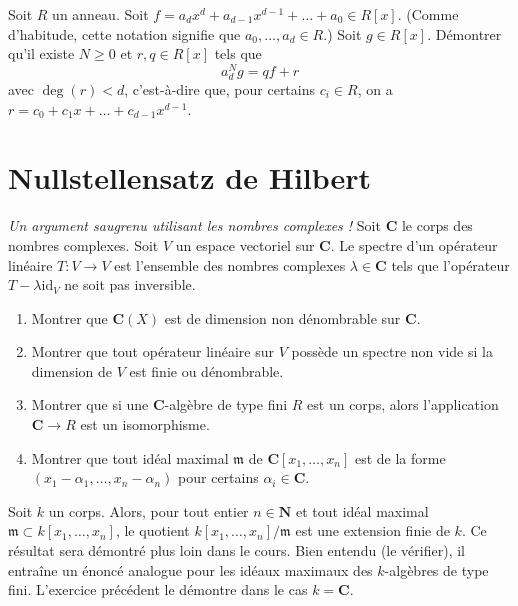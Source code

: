 \begin{exercise}
\label{exercise-division-with-remainder}
Soit $R$ un anneau. Soit
$f = a_d x^d + a_{d - 1} x^{d - 1} + \ldots + a_0 \in R[x]$.
(Comme d'habitude, cette notation signifie que $a_0, \ldots, a_d \in R$.) Soit $g \in R[x]$.
Démontrer qu'il existe $N \geq 0$ et $r, q \in R[x]$ tels que
$$
a_d^N g = q f + r
$$
avec $\deg(r) < d$, c'est-à-dire que, pour certains $c_i \in R$, on a
$r = c_0 + c_1 x + \ldots + c_{d - 1}x^{d - 1}$.
\end{exercise}







\section{Nullstellensatz de Hilbert}
\label{section-Hilbert-Nullstellensatz}


\begin{exercise}
\label{exercise-uncountable}
{\it Un argument saugrenu utilisant les nombres complexes !}
Soit ${\mathbf C}$ le corps des nombres complexes. Soit $V$ un espace vectoriel
sur ${\mathbf C}$. Le spectre d'un opérateur linéaire
$T : V \to V$ est l'ensemble des nombres complexes $\lambda \in {\mathbf C}$
tels que l'opérateur $T - \lambda \text{id}_V$ ne soit pas inversible.
\begin{enumerate}
\item Montrer que $\mathbf{C}(X)$
est de dimension non dénombrable sur ${\mathbf C}$.
\item Montrer que tout opérateur linéaire sur $V$ possède un
spectre non vide si la dimension de $V$ est finie ou
dénombrable.
\item Montrer que si une ${\mathbf C}$-algèbre de type fini
$R$ est un corps, alors l'application ${\mathbf C}\to R$ est un isomorphisme.
\item Montrer que tout idéal maximal ${\mathfrak m}$ de
${\mathbf C}[x_1, \ldots, x_n]$ est de la forme
$(x_1-\alpha_1, \ldots, x_n-\alpha_n)$ pour certains $\alpha_i \in {\mathbf C}$.
\end{enumerate}
\end{exercise}

\begin{remark}
\label{remark-HNSS}
Soit $k$ un corps. Alors, pour tout entier $n\in {\mathbf N}$ et
tout idéal maximal ${\mathfrak m} \subset k[x_1, \ldots, x_n]$,
le quotient $k[x_1, \ldots, x_n]/{\mathfrak m}$ est une extension finie
de $k$. Ce résultat sera démontré plus loin dans le cours. Bien entendu
(le vérifier), il entraîne un énoncé analogue pour les idéaux maximaux
des $k$-algèbres de type fini. L'exercice précédent le démontre
dans le cas $k = {\mathbf C}$.
\end{remark}

